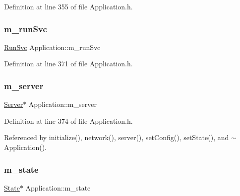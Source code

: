 Definition at line 355 of file Application.\+h.

\mbox{\label{classApplication_ad2c061af424280151c86b9b56d9724d3}} 
\subsubsection{\texorpdfstring{m\+\_\+run\+Svc}{m\_runSvc}}
{\footnotesize\ttfamily \hyperlink{Application_8h_a59643f52f9391fa83f137814aaae27ef}{Run\+Svc} Application\+::m\+\_\+run\+Svc\hspace{0.3cm}{\ttfamily [private]}}



Definition at line 371 of file Application.\+h.

\mbox{\label{classApplication_a5e6085b0f322d5036177b16113a75b56}} 
\subsubsection{\texorpdfstring{m\+\_\+server}{m\_server}}
{\footnotesize\ttfamily \hyperlink{classServer}{Server}$\ast$ Application\+::m\+\_\+server\hspace{0.3cm}{\ttfamily [private]}}



Definition at line 374 of file Application.\+h.



Referenced by initialize(), network(), server(), set\+Config(), set\+State(), and $\sim$\+Application().

\mbox{\label{classApplication_a0ef9832e2d286716e597a1ff21ffcab4}} 
\subsubsection{\texorpdfstring{m\+\_\+state}{m\_state}}
{\footnotesize\ttfamily \hyperlink{classState}{State}$\ast$ Application\+::m\+\_\+state\hspace{0.3cm}{\ttfamily [private]}}



